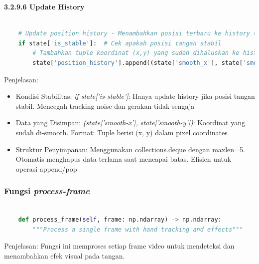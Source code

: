 \documentclass[11pt,a4paper]{article}
\begin{document}
    \noindent\textbf{3.2.9.6 Update History}
    \begin{lstlisting}[language=Python, caption=Single Finger Gesture]
        
    # Update position history - Menambahkan posisi terbaru ke history tracking
    if state['is_stable']:  # Cek apakah posisi tangan stabil
        # Tambahkan tuple koordinat (x,y) yang sudah dihaluskan ke history
        state['position_history'].append((state['smooth_x'], state['smooth_y']))
    \end{lstlisting}
    Penjelasan: 
    \begin{itemize}
        \item Kondisi Stabilitas: \textit{if state['is-stable']}: Hanya update history jika posisi tangan stabil. Mencegah tracking noise dan gerakan tidak sengaja
        \item Data yang Disimpan:\textit{ (state['smooth-x'], state['smooth-y'])}: Koordinat yang sudah di-smooth. Format: Tuple berisi (x, y) dalam pixel coordinates
        \item Struktur Penyimpanan: Menggunakan collections.deque dengan maxlen=5. Otomatis menghapus data terlama saat mencapai batas. Efisien untuk operasi append/pop
    \end{itemize}

    \subsubsection{Fungsi \textit{process-frame}}
    \begin{lstlisting}[language=Python, caption=Fungsi \textit{process-frame}]
    
    def process_frame(self, frame: np.ndarray) -> np.ndarray:
        """Process a single frame with hand tracking and effects"""
    \end{lstlisting}
    Penjelasan:
    Fungsi ini memproses setiap frame video untuk mendeteksi dan menambahkan efek visual pada tangan. 
\end{document}
